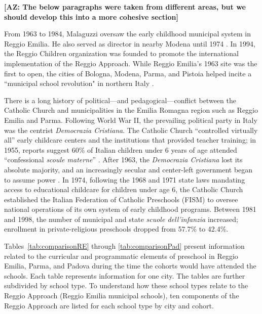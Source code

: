 \textbf{[AZ: The below paragraphs were taken from different areas, but we should develop this into a more cohesive section]}

From 1963 to 1984, Malaguzzi oversaw the early childhood municipal system in Reggio Emilia. He also served as director in nearby Modena until 1974 \citep{Cagliari-etal-eds_2016_BOOK_Loris-Malaguzzi}. In 1994, the Reggio Children organization was founded to promote the international implementation of the Reggio Approach. While Reggio Emilia's 1963 site was the first to open, the cities of Bologna, Modena, Parma, and Pistoia helped incite a ``municipal school revolution" in northern Italy \citep{Hohnerlein_2015_Development-and-Diffusion}. 

There is a long history of political---and pedagogical---conflict between the Catholic Church and municipalities in the Emilia Romagna region such as Reggio Emilia and Parma. Following World War II, the prevailing political party in Italy was the centrist \textit{Democrazia Cristiana}. The Catholic Church ``controlled virtually all'' early childcare centers and the institutions that provided teacher training; in 1955, reports suggest 60\% of Italian children under 6 years of age attended ``confessional \textit{scoule materne}'' \citep{Hohnerlein_2015_Development-and-Diffusion}. After 1963, the \textit{Democrazia Cristiana} lost its absolute majority, and an increasingly secular and center-left government began to assume power \citep{Hohnerlein_2009_Paradox-Public-Preschools}. In 1974, following the 1968 and 1971 state laws mandating access to educational childcare for children under age 6, the Catholic Church established the Italian Federation of Catholic Preschools (FISM) to oversee national operations of its own system of early childhood programs. Between 1981 and 1998, the number of municipal and state \textit{scuole dell'infanzia} increased; enrollment in private-religious preschools dropped from 57.7\% to 42.4\%.

Tables~\ref{tab:comparisonRE} through \ref{tab:comparisonPad} present information related to the curricular and programmatic elements of preschool in Reggio Emilia, Parma, and Padova during the time the cohorts would have attended the schools. Each table represents information for one city. The tables are further subdivided by school type. To understand how these school types relate to the Reggio Approach (Reggio Emilia municipal schools), ten components of the Reggio Approach are listed for each school type by city and cohort. 

